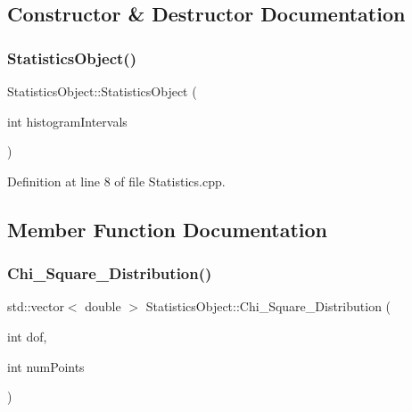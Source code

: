 \subsection{Constructor \& Destructor Documentation}
\mbox{\label{class_statistics_object_ad4893d12c42f2bfdcab96f4246750556}} 
\subsubsection{\texorpdfstring{Statistics\+Object()}{StatisticsObject()}}
{\footnotesize\ttfamily Statistics\+Object\+::\+Statistics\+Object (\begin{DoxyParamCaption}\item[{int}]{histogram\+Intervals }\end{DoxyParamCaption})}



Definition at line 8 of file Statistics.\+cpp.



\subsection{Member Function Documentation}
\mbox{\label{class_statistics_object_a2bdaa3f298838c3f83bf17189c832623}} 
\subsubsection{\texorpdfstring{Chi\+\_\+\+Square\+\_\+\+Distribution()}{Chi\_Square\_Distribution()}}
{\footnotesize\ttfamily std\+::vector$<$ double $>$ Statistics\+Object\+::\+Chi\+\_\+\+Square\+\_\+\+Distribution (\begin{DoxyParamCaption}\item[{int}]{dof,  }\item[{int}]{num\+Points }\end{DoxyParamCaption})\hspace{0.3cm}{\ttfamily [protected]}}



